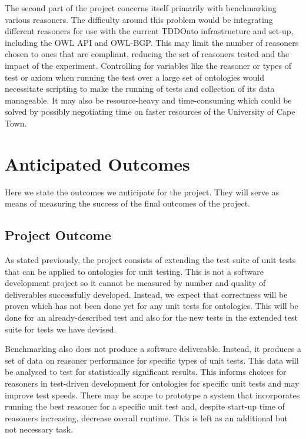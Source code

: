 \documentclass[draft]{sig-alternate}
\begin{document}
The second part of the project concerns itself primarily with benchmarking various reasoners. The difficulty around this problem would be integrating different reasoners for use with the current TDDOnto infrastructure and set-up, including the OWL API and OWL-BGP. This may limit the number of reasoners chosen to ones that are compliant, reducing the set of reasoners tested and the impact of the experiment. Controlling for variables like the reasoner or types of test or axiom when running the test over a large set of ontologies would necessitate scripting to make the running of tests and collection of its data manageable. It may also be resource-heavy and time-consuming which could be solved by possibly negotiating time on faster resources of the University of Cape Town.

\section{Anticipated Outcomes}

Here we state the outcomes we anticipate for the project. They will serve as means of measuring the success of the final outcomes of the project.

\subsection{Project Outcome}

As stated previously, the project consists of extending the test suite of unit tests that can be applied to ontologies for unit testing. This is not a software development project so it cannot be measured by number and quality of deliverables successfully developed. Instead, we expect that correctness will be proven which has not been done yet for any unit tests for ontologies. This will be done for an already-described test and also for the new tests in the extended test suite for tests we have devised.

Benchmarking also does not produce a software deliverable. Instead, it produces a set of data on reasoner performance for specific types of unit tests. This data will be analysed to test for statistically significant results. This informs choices for reasoners in test-driven development for ontologies for specific unit tests and may improve test speeds. There may be scope to prototype a system that incorporates running the best reasoner for a specific unit test and, despite start-up time of reasoners increasing, decrease overall runtime. This is left as an additional but not necessary task.
\end{document}
